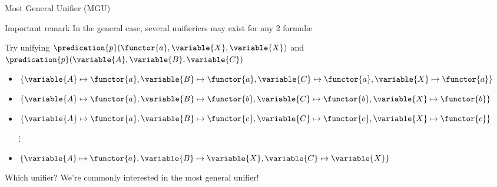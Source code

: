 \documentclass[presentation]{beamer}\mode<presentation>{\usetheme{AMSBolognaFC}}
\begin{document}
\begin{frame}{Most General Unifier (MGU)}

    \begin{alertblock}{Important remark}\centering
        In the general case, \alert{several} unifieriers may exist for any 2 formul\ae{}
    \end{alertblock}
    \begin{exampleblock}{Try unifying $\predication{p}(\functor{a}, \variable{X}, \variable{X})$ and $\predication{p}(\variable{A}, \variable{B}, \variable{C})$}
        \begin{itemize}
            \item $\{ \variable{A} \mapsto \functor{a}, \variable{B} \mapsto \functor{a}, \variable{C} \mapsto \functor{a}, \variable{X} \mapsto \functor{a} \}$
            \item $\{ \variable{A} \mapsto \functor{a}, \variable{B} \mapsto \functor{b}, \variable{C} \mapsto \functor{b}, \variable{X} \mapsto \functor{b} \}$
            \item $\{ \variable{A} \mapsto \functor{a}, \variable{B} \mapsto \functor{c}, \variable{C} \mapsto \functor{c}, \variable{X} \mapsto \functor{c} \}$
            \item[$\vdots$]
            \item \alert{$\{ \variable{A} \mapsto \functor{a}, \variable{B} \mapsto \variable{X}, \variable{C} \mapsto \variable{X} \}$} 
        \end{itemize}
    \end{exampleblock}
    \begin{block}{Which unifier?}
        We're commonly interested in the \alert{most general} unifier!
    \end{block}
\end{frame}
\end{document}

